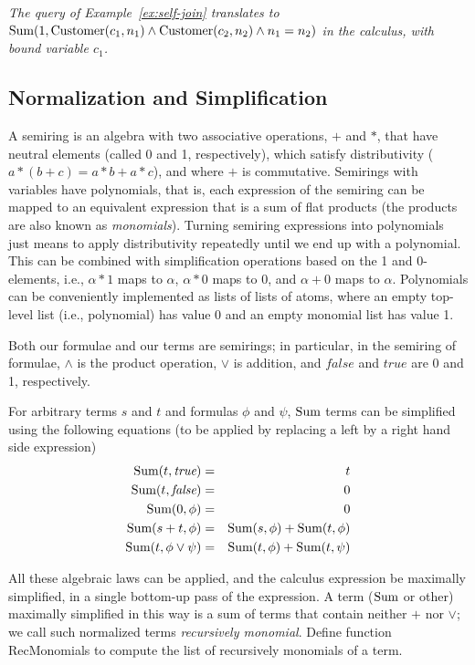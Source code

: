 \begin{example}\em
\label{ex:self-join-calc}
The query of Example~\ref{ex:self-join} translates to
$\mbox{Sum}(1, \mbox{Customer}(c_1,n_1) \land \mbox{Customer}(c_2, n_2) \land
n_1=n_2)$ in the calculus, with bound variable $c_1$.
\punto
\end{example}

\subsection{Normalization and Simplification}


A semiring is an algebra with two associative operations,
$+$ and $*$, that
have neutral elements (called 0 and 1, respectively), which satisfy
distributivity ($a*(b+c)= a*b + a*c$), and where $+$ is commutative.
Semirings with variables
have polynomials, that is, each expression of the
semiring can be mapped to an equivalent expression that is
a sum of flat products (the products are also known as {\em monomials}\/).
Turning semiring expressions into polynomials just means to apply
distributivity repeatedly until we end up with a polynomial.
This can be combined with simplification operations based on the 1 and
0-elements, i.e., $\alpha * 1$ maps to $\alpha$, $\alpha*0$ maps to $0$, and
$\alpha+0$ maps to $\alpha$. Polynomials can be conveniently implemented
as lists of lists of atoms, where an empty top-level list (i.e., polynomial)
has value 0 and an empty monomial list has value 1.

Both our formulae and our terms are semirings; in particular,
in the semiring of formulae, $\land$ is the product operation,
$\lor$ is addition,
and $\textit{false}$ and $\textit{true}$ are 0 and 1, respectively.

For arbitrary terms $s$ and $t$ and formulas $\phi$ and $\psi$,
$\mbox{Sum}$ terms can be simplified using the following equations (to be
applied by replacing a left by a right hand side expression)
\begin{eqnarray*}
\mbox{Sum}(t, \textit{true}) &=& t \\
\mbox{Sum}(t, \textit{false}) &=& 0 \\
\mbox{Sum}(0, \phi) &=& 0 \\
\mbox{Sum}(s+t, \phi) &=& \mbox{Sum}(s, \phi) + \mbox{Sum}(t, \phi) \\
\mbox{Sum}(t, \phi \lor \psi) &=& \mbox{Sum}(t, \phi) + \mbox{Sum}(t, \psi)
\end{eqnarray*}

All these algebraic laws can be applied, and the calculus expression
be maximally simplified, in a single bottom-up pass of the expression.
A term ($\mbox{Sum}$ or other) maximally simplified in this way
is a sum of terms that contain neither $+$ nor $\lor$; we call such 
normalized terms {\em recursively monomial}.
Define function RecMonomials to compute the list of recursively monomials
of a term.


